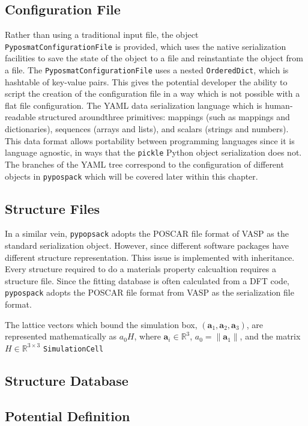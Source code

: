\subsection{Configuration File}
Rather than using a traditional input file, the object \verb|PyposmatConfigurationFile| is provided, which uses the native serialization facilities to save the state of the object to a file and reinstantiate the object from a file.  The \verb|PyposmatConfigurationFile| uses a nested \verb|OrderedDict|, which is hashtable of key-value pairs.  This gives the potential developer the ability to script the creation of the configuration file in a way which is not possible with a flat file configuration.  The YAML data serialization language\cite{yaml_version_1_2r} which is human-readable structured aroundthree primitives: mappings (such as mappings and dictionaries), sequences (arrays and lists), and scalars (strings and numbers).  This data format allows portability between programming languages since it is language agnostic, in ways that the \verb|pickle| Python object serialization does not.  The branches of the YAML tree correspond to the configuration of different objects in \verb|pypospack| which will be covered later within this chapter.

\subsection{Structure Files}
In a similar vein, \verb|pypopsack| adopts the POSCAR file format of VASP as the standard serialization object.  However, since different software packages have different structure representation.  Thiss issue is implemented with inheritance.
Every structure required to do a materials property calcualtion requires a structure file.  Since the fitting database is often calculated from a DFT code, \verb|pypospack| adopts the POSCAR file format from VASP as the serialization file format.

The lattice vectors which bound the simulation box, $(\bm{a}_1,\bm{a}_2,\bm{a}_3)$,  are represented mathematically as $a_0 H$, where $\bm{a}_i \in \mathbb{R}^3$, $a_0 = \lVert\bm{a}_1\rVert$, and the matrix $H \in \mathbb{R}^{3\times3}$
\verb|SimulationCell|

\subsection{Structure Database}
\subsection{Potential Definition}

